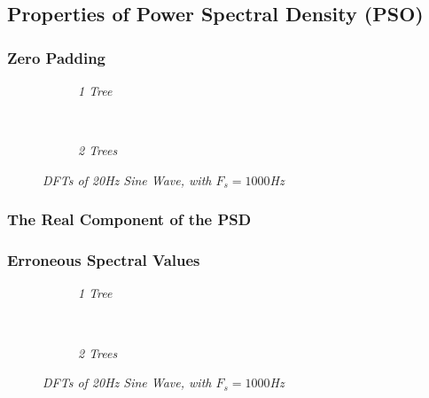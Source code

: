 \documentclass[./main.tex]{subfiles}
\begin{document}
\subsection{Properties of Power Spectral Density (PSO)}

\subsubsection{Zero Padding}

\begin{figure}[h]
	\centering
	\begin{subfigure}[b]{0.49\textwidth}
		\resizebox{\textwidth}{!}{}
		\caption{\textit{1 Tree}}
		\label{fig:1_2_a_10}
	\end{subfigure}
	~ %
	\begin{subfigure}[b]{0.49\textwidth}
		\resizebox{\textwidth}{!}{}
		\caption{\textit{2 Trees}}
		\label{fig:1_2_a_128}
	\end{subfigure}
	\label{fig:1_2_a}
	\caption{\textit{DFTs of 20Hz Sine Wave, with $ F_s = 1000 $Hz}}
\end{figure}

\subsubsection{The Real Component of the PSD}

\subsubsection{Erroneous Spectral Values}

\begin{figure}[h]
	\centering
	\begin{subfigure}[b]{0.49\textwidth}
		\resizebox{\textwidth}{!}{}
		\caption{\textit{1 Tree}}
		\label{fig:1_2_c_10}
	\end{subfigure}
	~ %
	\begin{subfigure}[b]{0.49\textwidth}
		\resizebox{\textwidth}{!}{}
		\caption{\textit{2 Trees}}
		\label{fig:1_2_c_128}
	\end{subfigure}
	\label{fig:1_2_a}
	\caption{\textit{DFTs of 20Hz Sine Wave, with $ F_s = 1000 $Hz}}
\end{figure}
\end{document}
